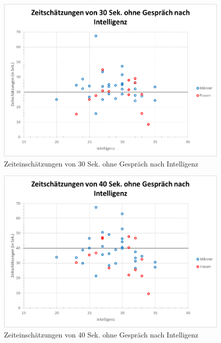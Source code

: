 \documentclass{Paper}
\begin{document}

\begin{figure}[H]
	\centering
	\includegraphics[scale=0.7]{../Diagramme/scatterPre/30ohne_intelligenz.png}
	\caption{Zeiteinschätzungen von 30 Sek. ohne Gespräch nach Intelligenz}
	\label{img:intell30ohne}
\end{figure}
\begin{figure}[H]
	\centering
	\includegraphics[scale=0.7]{../Diagramme/scatterPre/40ohne_intelligenz.png}
	\caption{Zeiteinschätzungen von 40 Sek. ohne Gespräch nach Intelligenz}
	\label{img:intell40ohne}
\end{figure}
\end{document}
